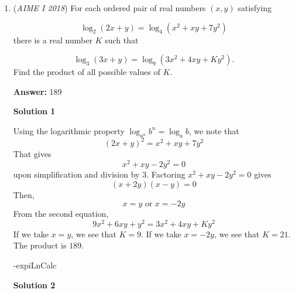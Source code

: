 \begin{enumerate}
 Alternatively, use sine rule in $\triangle{BDC}$. (It’s easier)

 



\textbf{Solution 12 (Double Angle Identity)}

We let $AD=x$. Then, angle $A$ is $2\sin^{-1}(\frac{3}{5})$ and so is angle $AED$. We note that $AE=10-x$. We drop an altitude from $D$ to $AE$, and we call the foot $F$. We note that $AF=\frac{10-x}{2}$. Using the double angle identity, we have $\sin(2\sin^{-1}(\frac{3}{5}))=2(\frac{3}{5})(\frac{4}{5})=\frac{24}{25}.$ Therefore, $DG=\frac{24}{25}AD.$ We now use the Pythagorean Theorem, which gives $(\frac{10-x}{2})^2+(\frac{24}{25}x)^2=x^2$. Rearranging and simplifying, this becomes $429x^2-12500x+62500=0$. Using the quadratic formula, this is $\frac{12500\pm\sqrt{12500^2-250000\cdot429}}{858}$. We take out a $10000$ from the square root and make it a $100$ outside of the square root to make it simpler. We end up with $\frac{12500\pm7000}{858}$. We note that this must be less than 10 to ensure that $10-x$ is positive. Therefore, we take the minus, and we get $\frac{5500}{858}=\frac{250}{39} \implies \fbox{289}.$



	\item (\textit{AIME I 2018}) For each ordered pair of real numbers $(x,y)$ satisfying

 \[\log_2(2x+y) = \log_4(x^2+xy+7y^2)\]there is a real number $K$ such that

 \[\log_3(3x+y) = \log_9(3x^2+4xy+Ky^2).\]Find the product of all possible values of $K$.


 
 \textbf{Answer: }189



\textbf{Solution 1}

Using the logarithmic property $\log_{a^n}b^n = \log_{a}b$, we note that 
 \[(2x+y)^2 = x^2+xy+7y^2\]That gives 
 \[x^2+xy-2y^2=0\] upon simplification and division by $3$. Factoring $x^2+xy-2y^2=0$ gives 
 \[(x+2y)(x-y)=0\] Then, 
 \[x=y \text{ or }x=-2y\]From the second equation, 
 \[9x^2+6xy+y^2=3x^2+4xy+Ky^2\] If we take $x=y$, we see that $K=9$. If we take $x=-2y$, we see that $K=21$. The product is $\boxed{189}$.

 -expiLnCalc

 



\textbf{Solution 2}


\end{enumerate}
